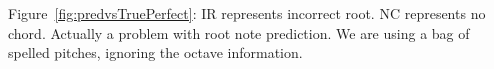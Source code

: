 \documentclass[12pt,a4paper,twoside,openany]{report} \usepackage[pdfborder={0 0 0}]{hyperref}    %
\theoremstyle{definition} \newtheorem{definition}{Definition}[section]
\begin{document}

Figure~\ref{fig:predvsTruePerfect}: IR represents incorrect root. NC represents no chord. Actually a problem with root
note prediction. We are using a bag of spelled pitches, ignoring the octave information.
\end{document}
